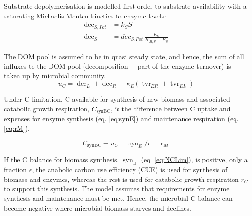 % 
Substrate depolymerisation is modelled first-order to substrate
availability with a saturating Michaelis-Menten kinetics to enzyme levels:
\begin{subequations}
\label{eq:dec}
\begin{align}
\operatorname{dec}_{S,Pot} &= k_S S
\\ 
\operatorname{dec}_S &= dec_{S,Pot} \, \frac{E_S}{K_{M,S} + E_S}
\end{align}
\end{subequations}
 
The DOM pool is assumed to be in quasi steady state, and hence, the sum of all
influxes to the DOM pool (decomposition + part of the enzyme turnover) is taken
up by microbial community.
\begin{equation}
\label{eq:uC}
u_C = \operatorname{dec}_L + \operatorname{dec}_R +  \kappa_E
(\operatorname{tvr}_{ER} + \operatorname{tvr}_{EL})
\end{equation}

Under C limitation, C available for synthesis of new biomass and
associated catabolic growth respiration, $C_{\operatorname{synBC}}$, is the
difference between C uptake and expenses for enzyme synthesis (eq.
\ref{eq:synE}) and maintenance respiration (eq.
\ref{eq:rM}).

\begin{equation}
\label{eq:synBC} 
C_{\operatorname{synBC}} = u_C -
\operatorname{syn}_E/\epsilon - \operatorname{r}_{M}
\end{equation}

If the C balance for biomass synthesis, $\operatorname{syn}_B$ (eq.
\ref{eq:NCLim}), is positive, only a fraction $\epsilon$, the anabolic
carbon use efficiency (CUE) is used for synthesis of biomass and enzymes,
whereas the rest is used for catabolic growth respiration $r_G$ to support this
synthesis.
The model assumes that requirements for enzyme synthesis and maintenance must be
met. Hence, the microbial C balance can become negative where microbial biomass starves
and declines.

